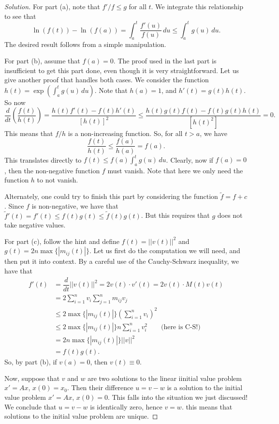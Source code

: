 \documentclass[Shifrin_Solutions_Spring_2015]{subfiles}
\begin{document}
\begin{proof}[Solution]
For part (a), note that $f'/f \leq g$ for all $t$. We integrate this relationship to see that
\[
\ln ( f(t) ) - \ln (f(a)) = \int_a^t \dfrac{f'(u)}{f(u)}\, du \leq \int_a^t g(u) \, du .
\]
The desired result follows from a simple manipulation.

For part (b), assume that $f(a) = 0$.  The proof used in the last part is insufficient to get this part done, even though it is very straightforward. Let us give another proof that handles both cases. We consider the function $h(t) = \exp\left(\int_a^t g(u)\, du\right)$. Note that $h(a) = 1$, and $h'(t) = g(t)h(t)$. So now
\[
\dfrac{d}{dt}\left( \dfrac{f(t)}{h(t)}\right) = \dfrac{h(t) f'(t) - f(t) h'(t)}{[h(t)]^2} \leq \dfrac{h(t)g(t)f(t) - f(t)g(t)h(t)}{[h(t)^2]} = 0.
\]
This means that $f/h$ is a non-increasing function. So, for all $t>a$, we have
\[
\dfrac{f(t)}{h(t)} \leq \dfrac{f(a)}{h(a)} = f(a).
\]
This translates directly to $f(t) \leq f(a) \int_a^t g(u)\, du $. Clearly, now if $f(a) = 0$, then the non-negative function $f$ must vanish. Note that here we only need the function $h$ to not vanish.

Alternately, one could try to finish this part by considering the function $\tilde{f} = f + c$. Since $f$ is non-negative, we have that
$\tilde{f}'(t) = f'(t) \leq f(t) g(t) \leq \tilde{f}(t)g(t)$. But this requires that $g$ does not take negative values.


For part (c), follow the hint and define $f(t) = ||v(t) ||^2$ and $g(t) = 2n \max\{|m_{ij}(t)|\}$.
Let us first do the computation we will need, and then put it into context. By a careful use of the Cauchy-Schwarz inequality, we have that
\[
\begin{split}
f'(t) & = \dfrac{d}{dt}||v(t)||^2 = 2v(t)\cdot v'(t) = 2 v(t) \cdot M(t) v(t) \\
	& = 2 \sum_{i=1}^n v_i \sum_{j=1}^n m_{ij}v_j \\
	& \leq 2 \max\{|m_{ij}(t)|\} \left(\sum_{i=1}^n v_i \right)^2 \\
	& \leq 2 \max\{|m_{ij}(t)|\} n \sum_{i=1}^n v_i^2  \qquad \mbox{(here is C-S!)} \\
	& = 2n \max\{|m_{ij}(t)|\} ||v||^2 \\
	& = f(t)g(t).
\end{split}
\]
So, by part (b), if $v(a)=0$, then $v(t) \equiv 0$.

Now, suppose that $v$ and $w$ are two solutions to the linear iinitial value problem $x' = A x$, $x(0)=x_0$. Then their difference $u = v - w$ is a solution to the initial value problem $x' = Ax$, $x(0) = 0$. This falls into the situation we just discussed! We conclude that $u = v-w$ is identically zero, hence $v=w$. this means that solutions to the initial value problem are unique.



\end{proof}
\end{document}
